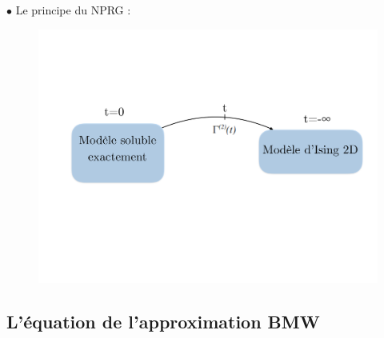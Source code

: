 \documentclass[9pt]{beamer}
\begin{document}
	\begin{frame}
		\justifying
		\vspace*{22pt}
		
		$\bullet$ Le principe du NPRG : 
		
	\begin{figure}[H]
	\begin{center}
		\includegraphics[scale = 0.35]{SchemaRG2.pdf}
	\label{fig:schemaIsing}
	\end{center}
	\end{figure}
  \end{frame}


\subsection{L'équation de l'approximation BMW}
\end{document}
